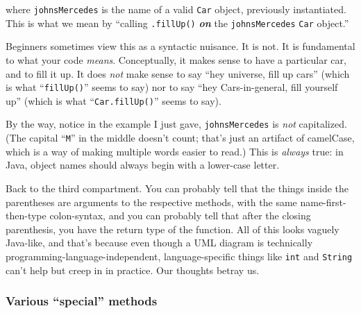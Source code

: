 
where \texttt{johnsMercedes} is the name of a valid \texttt{Car} object,
previously instantiated. This is what we mean by ``calling \texttt{.fillUp()}
\textit{\textbf{on}} the \texttt{johnsMercedes} \texttt{Car} object.''

Beginners sometimes view this as a syntactic nuisance. It is not. It is
fundamental to what your code \textit{means}. Conceptually, it makes sense to
have a particular car, and to fill it up. It does \textit{not} make sense to
say ``hey universe, fill up cars'' (which is what ``\texttt{fillUp()}'' seems to
say) nor to say ``hey Cars-in-general, fill yourself up'' (which is what
``\texttt{Car.fillUp()}'' seems to say).

By the way, notice in the example I just gave, \texttt{johnsMercedes} is
\textit{not} capitalized. (The capital ``\texttt{M}'' in the middle doesn't
count; that's just an artifact of camelCase, which is a way of making multiple
words easier to read.) This is \textit{always} true: in Java, object names
should always begin with a lower-case letter.

Back to the third compartment. You can probably tell that the things inside the
parentheses are arguments to the respective methods, with the same
name-first-then-type colon-syntax, and you can probably tell that after the
closing parenthesis, you have the return type of the function. All of this
looks vaguely Java-like, and that's because even though a UML diagram is
technically programming-language-independent, language-specific things like
\texttt{int} and \texttt{String} can't help but creep in in practice. Our
thoughts betray us.

\subsubsection{Various ``special'' methods}
\label{page:instantiateConstructor}

